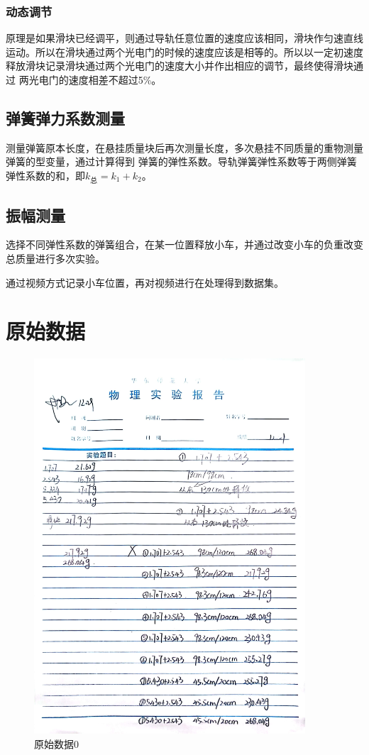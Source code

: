 \documentclass{ctexart}
\begin{document}
    \subsubsection{动态调节}
    原理是如果滑块已经调平，则通过导轨任意位置的速度应该相同，滑块作匀速直线
    运动。所以在滑块通过两个光电门的时候的速度应该是相等的。所以以一定初速度
    释放滑块记录滑块通过两个光电门的速度大小并作出相应的调节，最终使得滑块通过
    两光电门的速度相差不超过5\%。
  \subsection{弹簧弹力系数测量}
  测量弹簧原本长度，在悬挂质量块后再次测量长度，多次悬挂不同质量的重物测量弹簧的型变量，通过计算得到
  弹簧的弹性系数。导轨弹簧弹性系数等于两侧弹簧弹性系数的和，即$k_{\mbox{总}}=k_{1}+k_{2}$。
  \subsection{振幅测量}
  选择不同弹性系数的弹簧组合，在某一位置释放小车，并通过改变小车的负重改变总质量进行多次实验。

  通过视频方式记录小车位置，再对视频进行在处理得到数据集。
\newpage

\section{原始数据}
\begin{figure}[H]
  \centering
  \includegraphics[width=0.9\textwidth,height=0.85\textheight]{shujvchuli0.jpg}
  \caption{原始数据0}
\end{figure}
\end{document}
